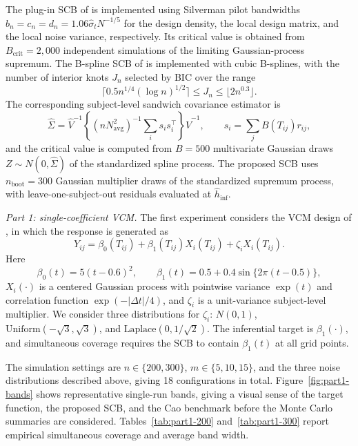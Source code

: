 \documentclass[12pt]{article} %
\theoremstyle{definition}
\begin{document}
The plug-in SCB of \citet{Cao2018} is implemented using Silverman pilot bandwidths
\(b_n=c_n=d_n=1.06\widehat\sigma_tN^{-1/5}\) for the design density, the local
design matrix, and the local noise variance, respectively. Its critical value
is obtained from \(B_{\mathrm{crit}}=2{,}000\) independent simulations of the
limiting Gaussian-process supremum. The B-spline SCB of \citet{CaiHu2025} is
implemented with cubic B-splines, with the number of interior knots \(J_n\)
selected by BIC over the range
\[
\lceil 0.5n^{1/4}(\log n)^{1/2}\rceil
\le J_n\le
\lfloor 2n^{0.3}\rfloor .
\]
The corresponding subject-level sandwich covariance estimator is
\[
\widehat\Sigma
=\widehat V^{-1}
\left\{(nN_{\mathrm{avg}}^2)^{-1}\sum_i s_is_i^\top\right\}
\widehat V^{-1},
\qquad
s_i=\sum_jB(T_{ij})r_{ij},
\]
and the critical value is computed from \(B=500\) multivariate Gaussian draws
\(Z\sim N(0,\widehat\Sigma)\) of the standardized spline process. The proposed
SCB uses \(n_{\mathrm{boot}}=300\) Gaussian multiplier draws of the standardized
supremum process, with leave-one-subject-out residuals evaluated at
\(\hat h_{\mathrm{inf}}\).

\emph{Part 1: single-coefficient VCM.}
The first experiment considers the VCM design of \citet{Cao2018}, in which the response is
generated as
\begin{equation}
\label{eq:part1-dgp}
Y_{ij}=\beta_0(T_{ij})+\beta_1(T_{ij})X_i(T_{ij})
       +\zeta_iX_i(T_{ij}).
\end{equation}
Here
\[
\beta_0(t)=5(t-0.6)^2,\qquad
\beta_1(t)=0.5+0.4\sin\{2\pi(t-0.5)\},
\]
\(X_i(\cdot)\) is a centered Gaussian process with pointwise variance
\(\exp(t)\) and correlation function \(\exp(-|\Delta t|/4)\), and
\(\zeta_i\) is a unit-variance subject-level multiplier. We consider three
distributions for \(\zeta_i\): \(N(0,1)\),
\(\mathrm{Uniform}(-\sqrt3,\sqrt3)\), and
\(\mathrm{Laplace}(0,1/\sqrt2)\). The inferential target is
\(\beta_1(\cdot)\), and simultaneous coverage requires the SCB to contain
\(\beta_1(t)\) at all grid points.

The simulation settings are \(n\in\{200,300\}\), \(m\in\{5,10,15\}\), and the
three noise distributions described above, giving 18 configurations in total.
Figure~\ref{fig:part1-bands} shows representative single-run bands, giving a
visual sense of the target function, the proposed SCB, and the Cao benchmark
before the Monte Carlo summaries are considered. Tables~\ref{tab:part1-200}
and~\ref{tab:part1-300} report empirical
simultaneous coverage and average band width.
\end{document}
